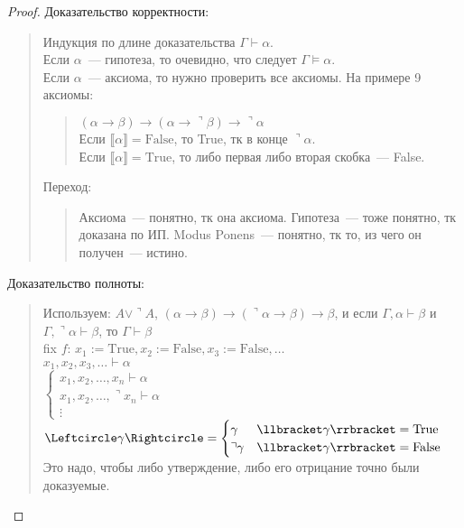 \documentclass{article}
\begin{document}
	\begin{proof}
		Доказательство корректности:
		\begin{quote}
			Индукция по длине доказательства $\Gamma \vdash \alpha$. \\
			Если $\alpha$~--- гипотеза, то очевидно, что следует $\Gamma \vDash \alpha$. \\
			Если $\alpha$~--- аксиома, то нужно проверить все аксиомы. На примере 9 аксиомы:
			\begin{quote}
				$(\alpha \rightarrow \beta) \rightarrow (\alpha \rightarrow \urcorner \beta) \rightarrow \urcorner \alpha$ \\
				Если $\llbracket \alpha \rrbracket = \text{False}$, то True, тк в конце $\urcorner \alpha$. \\
				Если $\llbracket \alpha \rrbracket = \text{True}$, то либо первая либо вторая скобка~--- False.
			\end{quote}
			Переход:
			\begin{quote}
				Аксиома~--- понятно, тк она аксиома. Гипотеза~--- тоже понятно, тк доказана по ИП. Modus Ponens~--- понятно, тк то, из чего он получен~--- истино.
			\end{quote}
		\end{quote}
		Доказательство полноты:
		\begin{quote}
			Используем: $A \vee \urcorner A$, $(\alpha \rightarrow \beta) \rightarrow (\urcorner \alpha \rightarrow \beta) \rightarrow \beta$, и если $\Gamma, \alpha \vdash \beta$ и $\Gamma, \urcorner \alpha \vdash \beta$, то $\Gamma \vdash \beta$ \\
			fix $f$: $x_1 := \text{True}, x_2 := \text{False}, x_3 := \text{False}, \dots$ \\
			$x_1, x_2, x_3, \dots \vdash \alpha$ \\
			$\begin{cases}
				x_1, x_2, \dots, x_n \vdash \alpha \\
				x_1, x_2, \dots, \urcorner x_n \vdash \alpha \\
				\vdots
			\end{cases}$ \\
			$\Leftcircle \gamma \Rightcircle =
			\begin{cases}
				\gamma & \llbracket \gamma \rrbracket = \text{True} \\
				\urcorner \gamma & \llbracket \gamma \rrbracket = \text{False}
			\end{cases}
			$ Это надо, чтобы либо утверждение, либо его отрицание точно были доказуемые. \\
		\end{quote}
	\end{proof}
\end{document}
